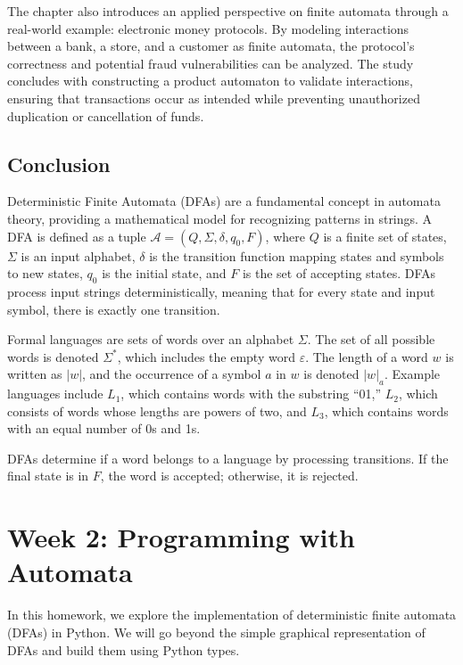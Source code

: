 \documentclass{article}
\begin{document}
The chapter also introduces an applied perspective on finite automata through a real-world example: electronic money protocols. By modeling interactions between a bank, a store, and a customer as finite automata, the protocol’s correctness and potential fraud vulnerabilities can be analyzed. The study concludes with constructing a product automaton to validate interactions, ensuring that transactions occur as intended while preventing unauthorized duplication or cancellation of funds.

\subsection{Conclusion}
\maketitle

Deterministic Finite Automata (DFAs) are a fundamental concept in automata theory, providing a mathematical model for recognizing patterns in strings. A DFA is defined as a tuple \(\mathcal{A} = (Q, \Sigma, \delta, q_0, F)\), where \(Q\) is a finite set of states, \(\Sigma\) is an input alphabet, \(\delta\) is the transition function mapping states and symbols to new states, \(q_0\) is the initial state, and \(F\) is the set of accepting states. DFAs process input strings deterministically, meaning that for every state and input symbol, there is exactly one transition.

Formal languages are sets of words over an alphabet \(\Sigma\). The set of all possible words is denoted \(\Sigma^*\), which includes the empty word \(\varepsilon\). The length of a word \(w\) is written as \(|w|\), and the occurrence of a symbol \(a\) in \(w\) is denoted \(|w|_a\). Example languages include \(L_1\), which contains words with the substring “01,” \(L_2\), which consists of words whose lengths are powers of two, and \(L_3\), which contains words with an equal number of 0s and 1s.

DFAs determine if a word belongs to a language by processing transitions. If the final state is in \(F\), the word is accepted; otherwise, it is rejected.

\newpage

\section{Week 2: Programming with Automata}

In this homework, we explore the implementation of deterministic finite automata (DFAs) in Python. 
We will go beyond the simple graphical representation of DFAs and build them using Python types.
\end{document}
